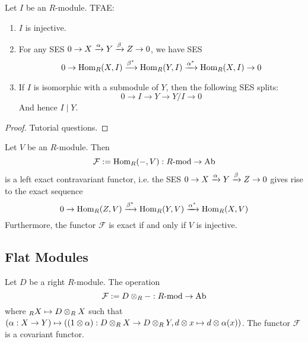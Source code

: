 \begin{pro}
    Let $I$ be an $R$-module. TFAE:
    \begin{enumerate}
        \item $I$ is injective.
        \item For any SES $0\to X\xrightarrow{\alpha} Y\xrightarrow{\beta} Z\to 0$, we have SES 
        \[0 \to \operatorname{Hom}_R(X,I) \xrightarrow{\beta^*} \operatorname{Hom}_R(Y,I) \xrightarrow{\alpha^*} \operatorname{Hom}_R(X,I) \to 0\]
        \item If $I$ is isomorphic with a submodule of $Y$, then the following SES splits:
        \[0 \to I \to Y\to Y/I \to 0\]
        And hence $I\mid Y$.
    \end{enumerate}
\end{pro}
\begin{proof}
    Tutorial questions.
\end{proof}

\begin{cor}
    Let $V$ be an $R$-module. Then
    \[\mathcal F:= \operatorname{Hom}_R(-, V): R\text{-mod} \to \text{Ab}\]
    is a left exact contravariant functor, i.e. the SES $0\to X\xrightarrow{\alpha} Y\xrightarrow{\beta} Z\to 0$ gives rise to the exact sequence
    \[0 \to \operatorname{Hom}_R(Z,V) \xrightarrow{\beta^*} \operatorname{Hom}_R(Y,V) \xrightarrow{\alpha^*} \operatorname{Hom}_R(X,V)\]
    Furthermore, the functor $\mathcal F$ is exact if and only if $V$ is injective.
\end{cor}

\subsection{Flat Modules}
Let $D$ be a right $R$-module. The operation
\[\mathcal F := D \otimes_R -:R\text{-mod} \to \text{Ab}\]
where $_RX\mapsto D\otimes_R X$ such that $(\alpha:X\to Y)\mapsto \left((1\otimes \alpha):D\otimes_R X \to D\otimes_R Y, d\otimes x \mapsto d\otimes \alpha(x)\right)$. The functor $\mathcal F$ is a covariant functor. 

